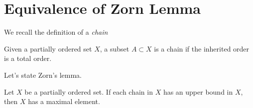 





\iftrue
 
 
 
 
 
 
 
 
 
 
 
\else
 \setcounter{chapter}{4}  
 \setcounter{chapter}{9}  
 \setcounter{chapter}{10}  
\fi



\iffalse
\setcounter{chapter}{10}


\fi


\appendix
{}


\section{Equivalence of Zorn Lemma}

We recall the definition of a \emph{chain}

Given a partially ordered set $X$, a subset \(A\subset X\) is a chain
if the inherited order is a total order.

Let's state Zorn's lemma.
\begin{llem}
Let $X$ be a partially ordered set. If each chain in $X$ has an upper bound
in $X$, then $X$ has a maximal element.
\end{llem}

